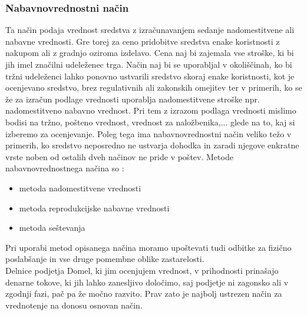 \documentclass[12pt,a4paper]{amsart}
\theoremstyle{definition} %
\theoremstyle{plain} %
\begin{document}
\subsubsection{Nabavnovrednostni način}
Ta način podaja vrednost sredstva z izračunavanjem sedanje nadomestitvene ali nabavne vrednosti. Gre torej za ceno pridobitve sredstva enake koristnosti z nakupom ali z gradnjo oziroma izdelavo. Cena naj bi zajemala vse stroške, ki bi jih imel značilni udeleženec trga. Način naj bi se uporabljal v okoliščinah, ko bi tržni udeleženci lahko ponovno ustvarili sredstvo skoraj enake koristnosti, kot je ocenjevano sredstvo, brez regulativnih ali zakonskih omejitev ter v primerih, ko se že za izračun podlage vrednosti uporablja nadomestitvene stroške npr. nadomestitveno nabavno vrednost. Pri tem z izrazom podlaga vrednosti mislimo bodisi na tržno, pošteno vrednost, vrednost za naložbenika,... glede na to, kaj si izberemo za ocenjevanje. Poleg tega ima nabavnovrednostni način veliko težo v primerih, ko sredstvo neposredno ne ustvarja dohodka in zaradi njegove enkratne vrste noben od ostalih dveh načinov ne pride v poštev. 
Metode nabavnovrednostnega načina so :
\begin{itemize}
\item metoda nadomestitvene vrednosti
\item metoda reprodukcijske nabavne vrednosti
\item metoda seštevanja
\end{itemize}
Pri uporabi metod opisanega načina moramo upoštevati tudi odbitke za fizično poslabšanje in vse druge pomembne oblike zastarelosti.\\
Delnice podjetja Domel, ki jim ocenjujem vrednost, v prihodnosti prinašajo denarne tokove, ki jih lahko zanesljivo določimo, saj podjetje ni zagonsko ali v zgodnji fazi, pač pa že močno razvito. Prav zato je najbolj ustrezen način za vrednotenje na donosu osnovan način.
\end{document}
